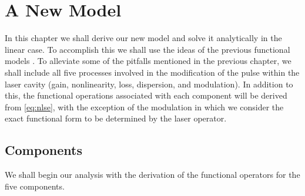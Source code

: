 
\chapter{A New Model}
\label{chap:linear}
In this chapter we shall derive our new model and solve it analytically in the linear case. To accomplish this we shall use the ideas of the previous functional models \cite{cutler, seigman, kuizenga1970a, kuizenga1970b, kuizenga1970, martinez1984, martinez1985, burgoyne2014}. To alleviate some of the pitfalls mentioned in the previous chapter, we shall include all five processes involved in the modification of the pulse within the laser cavity (gain, nonlinearity, loss, dispersion, and modulation). In addition to this, the functional operations associated with each component will be derived from \eqref{eq:nlse}, with the exception of the modulation in which we consider the exact functional form to be determined by the laser operator. \\

\section{Components}
We shall begin our analysis with the derivation of the functional operators for the five components. \\

